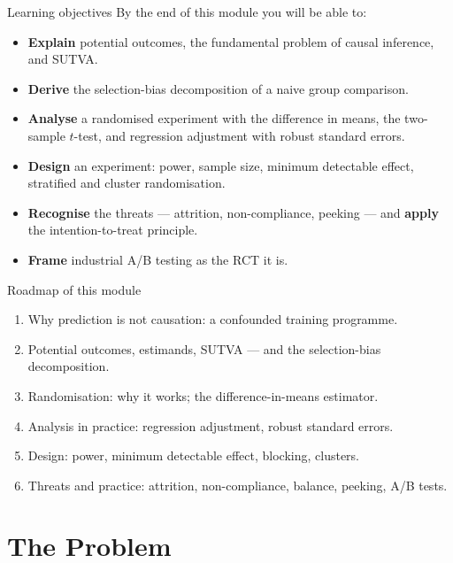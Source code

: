 \documentclass[aspectratio=169,11pt]{beamer}
\begin{document}
\begin{frame}{Learning objectives}
  By the end of this module you will be able to:
  \begin{itemize}
    \item \textbf{Explain} potential outcomes, the fundamental problem of causal
          inference, and SUTVA.
    \item \textbf{Derive} the selection-bias decomposition of a naive group comparison.
    \item \textbf{Analyse} a randomised experiment with the difference in means, the
          two-sample $t$-test, and regression adjustment with robust standard errors.
    \item \textbf{Design} an experiment: power, sample size, minimum detectable effect,
          stratified and cluster randomisation.
    \item \textbf{Recognise} the threats --- attrition, non-compliance, peeking --- and
          \textbf{apply} the intention-to-treat principle.
    \item \textbf{Frame} industrial A/B testing as the RCT it is.
  \end{itemize}
\end{frame}

\begin{frame}{Roadmap of this module}
  \begin{takeaway}
    \begin{enumerate}
      \item Why prediction is not causation: a confounded training programme.
      \item Potential outcomes, estimands, SUTVA --- and the selection-bias decomposition.
      \item Randomisation: why it works; the difference-in-means estimator.
      \item Analysis in practice: regression adjustment, robust standard errors.
      \item Design: power, minimum detectable effect, blocking, clusters.
      \item Threats and practice: attrition, non-compliance, balance, peeking, A/B tests.
    \end{enumerate}
  \end{takeaway}
\end{frame}


\section{The Problem}
\end{document}
